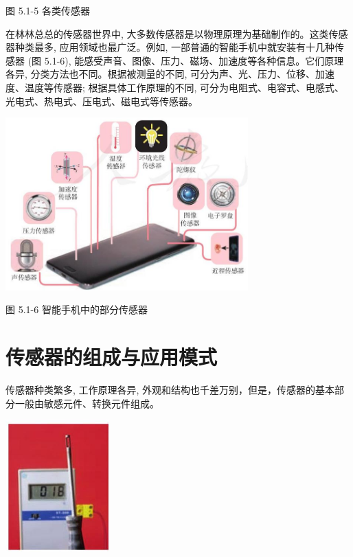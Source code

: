 \documentclass[10pt]{article}
\begin{document}
图 5.1-5 各类传感器

在林林总总的传感器世界中, 大多数传感器是以物理原理为基础制作的。这类传感器种类最多, 应用领域也最广泛。例如, 一部普通的智能手机中就安装有十几种传感器 (图 5.1-6), 能感受声音、图像、压力、磁场、加速度等各种信息。它们原理各异, 分类方法也不同。根据被测量的不同, 可分为声、光、压力、位移、加速度、温度等传感器; 根据具体工作原理的不同, 可分为电阻式、电容式、电感式、光电式、热电式、压电式、磁电式等传感器。

\begin{center}
\includegraphics[max width=0.7\textwidth]{images/01910e72-c5b7-7ed5-a6d4-fb3a5faefc32_98_926597.jpg}
\end{center}

图 5.1-6 智能手机中的部分传感器

\section*{传感器的组成与应用模式}

传感器种类繁多, 工作原理各异, 外观和结构也千差万别，但是，传感器的基本部分一般由敏感元件、转换元件组成。

\begin{center}
\includegraphics[max width=0.3\textwidth]{images/01910e72-c5b7-7ed5-a6d4-fb3a5faefc32_99_600368.jpg}
\end{center}
\end{document}
